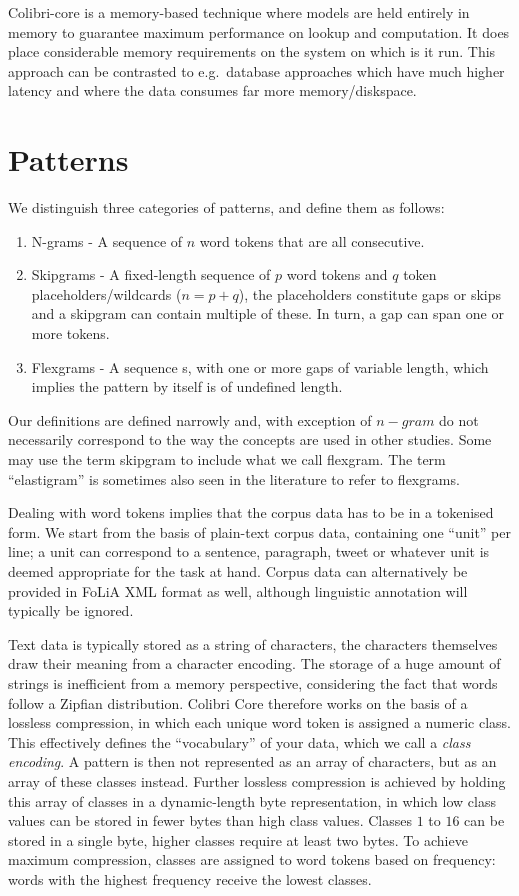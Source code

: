 Colibri-core is a memory-based technique where models are held entirely in
memory to guarantee maximum performance on lookup and computation. It does
place considerable memory requirements on the system on which is it run. This
approach can be contrasted to e.g.\ database approaches which have much higher
latency and where the data consumes far more memory/diskspace.

\section{Patterns}

We distinguish three categories of patterns, and define them as follows:

\begin{enumerate}
    \item N-grams - A sequence of $n$ word tokens that are all consecutive.
    \item Skipgrams - A fixed-length sequence of $p$ word tokens and $q$ token placeholders/wildcards ($n=p+q$), the placeholders constitute gaps or skips and a skipgram can contain multiple of these. In turn, a gap can span one or more tokens. 
    \item Flexgrams - A sequence s, with one or more gaps of variable length, which implies the pattern by itself is of undefined length.
\end{enumerate}

Our definitions are defined narrowly and, with exception of $n-gram$ do not
necessarily correspond to the way the concepts are used in other studies. Some
may use the term skipgram to include what we call flexgram.  The term
``elastigram'' is sometimes also seen in the literature to refer to flexgrams. 

Dealing with word tokens implies that the corpus data has to be in a
tokenised form. We start from the basis of plain-text corpus data, containing one
``unit'' per line; a unit can correspond to a sentence, paragraph, tweet
or whatever unit is deemed appropriate for the task at hand. Corpus data can
alternatively be provided in FoLiA XML format \cite{TODO} as well, although linguistic
annotation will typically be ignored.

Text data is typically stored as a string of characters, the
characters themselves draw their meaning from a character encoding. The
storage of a huge amount of strings is inefficient from a memory perspective,
considering the fact that words follow a Zipfian distribution. Colibri Core
therefore works on the basis of a lossless compression, in which each unique
word token is assigned a numeric class. This effectively defines the
``vocabulary'' of your data, which we call a \emph{class encoding}. A pattern
is then not represented as an array of characters, but as an array of these
classes instead. Further lossless compression is achieved by holding this array
of classes in a dynamic-length byte representation, in which low class values
can be stored in fewer bytes than high class values. Classes $1$ to $16$ can be
stored in a single byte, higher classes require at least two bytes. To achieve
maximum compression, classes are assigned to word tokens based on frequency:
words with the highest frequency receive the lowest classes.

